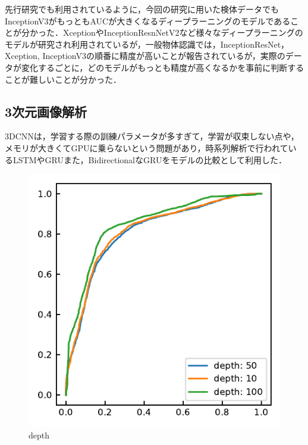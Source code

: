 先行研究でも利用されているように，今回の研究に用いた検体データでもInceptionV3がもっともAUCが大きくなるディープラーニングのモデルであることが分かった．XceptionやInceptionResnNetV2など様々なディープラーニングのモデルが研究され利用されているが，一般物体認識では，InceptionResNet，Xception, InceptionV3の順番に精度が高いことが報告されているが，実際のデータが変化するごとに，どのモデルがもっとも精度が高くなるかを事前に判断することが難しいことが分かった．

\subsection{3次元画像解析}
3DCNNは，学習する際の訓練パラメータが多すぎて，学習が収束しない点や，メモリが大きくてGPUに乗らないという問題があり，時系列解析で行われているLSTMやGRUまた，BidirectionalなGRUをモデルの比較として利用した．

\begin{figure}
	\centering
	\includegraphics[width=0.7\linewidth]{fig/chapter4/3d/roc/depth_all.pdf}
	\caption{depth}
	\label{fig:depthall}
\end{figure}

